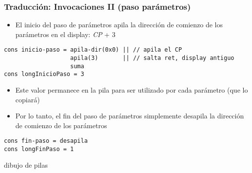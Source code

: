 \documentclass[hyperref={pdfpagelabels=false},tree-dvips,compress]{beamer}
\begin{document}
\begin{frame}[fragile]
\frametitle{Traducción: Invocaciones II (paso parámetros)}

\begin{itemize}
	\item El inicio del paso de parámetros apila la dirección de comienzo de los parámetros en el display: \emph{CP} + 3
\end{itemize}

\begin{lstlisting}[style=codigoMP,basicstyle=\scriptsize\ttfamily,mathescape]
cons inicio-paso = apila-dir(0x0) || // apila el CP
                   apila(3)       || // salta ret, display antiguo
                   suma
cons longInicioPaso = 3
\end{lstlisting}

\begin{itemize}
	\item Este valor permanece en la pila para ser utilizado por cada parámetro (que lo copiará)
\end{itemize}

\begin{itemize}
	\item Por lo tanto, el fin del paso de parámetros simplemente desapila la dirección de comienzo de los parámetros
\end{itemize}

\begin{lstlisting}[style=codigoMP,basicstyle=\scriptsize\ttfamily,mathescape]
cons fin-paso = desapila
cons longFinPaso = 1
\end{lstlisting}

dibujo de pilas

\end{frame}
\end{document}
